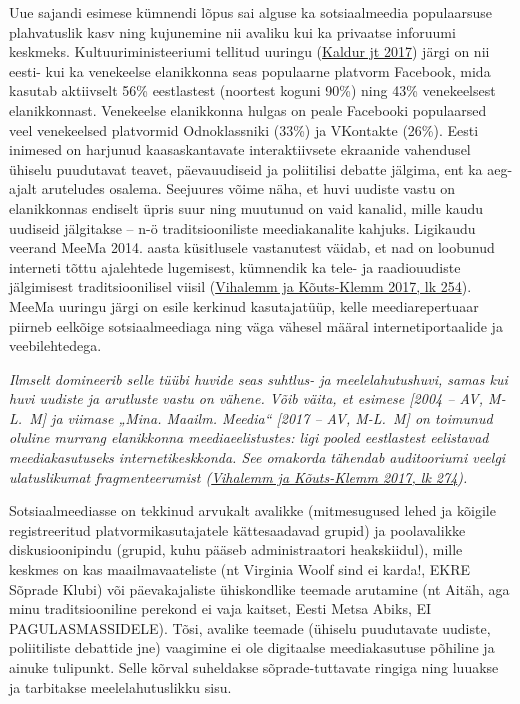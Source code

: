 \documentclass[estonian,]{article}
\begin{document}
Uue sajandi esimese kümnendi lõpus sai alguse ka sotsiaalmeedia populaarsuse plahvatuslik kasv ning kujunemine nii avaliku kui ka privaatse inforuumi keskmeks. Kultuuriministeeriumi tellitud uuringu (\protect\hyperlink{Kaldur2017}{Kaldur jt 2017}) järgi on nii eesti- kui ka venekeelse elanikkonna seas populaarne platvorm Facebook, mida kasutab aktiivselt 56\% eestlastest (noortest koguni 90\%) ning 43\% venekeelsest elanikkonnast. Venekeelse elanikkonna hulgas on peale Facebooki populaarsed veel venekeelsed platvormid Odnoklassniki (33\%) ja VKontakte (26\%). Eesti inimesed on harjunud kaasaskantavate interaktiivsete ekraanide vahendusel ühiselu puudutavat teavet, päevauudiseid ja poliitilisi debatte jälgima, ent ka aeg-ajalt aruteludes osalema. Seejuures võime näha, et huvi uudiste vastu on elanikkonnas endiselt üpris suur ning muutunud on vaid kanalid, mille kaudu uudiseid jälgitakse -- n-ö traditsiooniliste meediakanalite kahjuks. Ligikaudu veerand MeeMa 2014. aasta küsitlusele vastanutest väidab, et nad on loobunud interneti tõttu ajalehtede lugemisest, kümnendik ka tele- ja raadiouudiste jälgimisest traditsioonilisel viisil (\protect\hyperlink{Vihalemm2017}{Vihalemm ja Kõuts-Klemm 2017, lk 254}). MeeMa uuringu järgi on esile kerkinud kasutajatüüp, kelle meediarepertuaar piirneb eelkõige sotsiaalmeediaga ning väga vähesel määral internetiportaalide ja veebilehtedega.

\emph{Ilmselt domineerib selle tüübi huvide seas suhtlus- ja meelelahutushuvi, samas kui huvi uudiste ja arutluste vastu on vähene. Võib väita, et esimese {[}2004 -- AV, M-L.~M{]} ja viimase „Mina. Maailm. Meedia`` {[}2017 -- AV, M-L.~M{]} on toimunud oluline murrang elanikkonna meediaeelistustes: ligi pooled eestlastest eelistavad meediakasutuseks internetikeskkonda. See omakorda tähendab auditooriumi veelgi ulatuslikumat fragmenteerumist (\protect\hyperlink{Vihalemm2017}{Vihalemm ja Kõuts-Klemm 2017, lk 274}).}

Sotsiaalmeediasse on tekkinud arvukalt avalikke (mitmesugused lehed ja kõigile registreeritud platvormikasutajatele kättesaadavad grupid) ja poolavalikke diskusioonipindu (grupid, kuhu pääseb administraatori heakskiidul), mille keskmes on kas maailmavaateliste (nt Virginia Woolf sind ei karda!, EKRE Sõprade Klubi) või päevakajaliste ühiskondlike teemade arutamine (nt Aitäh, aga minu traditsiooniline perekond ei vaja kaitset, Eesti Metsa Abiks, EI PAGULASMASSIDELE). Tõsi, avalike teemade (ühiselu puudutavate uudiste, poliitiliste debattide jne) vaagimine ei ole digitaalse meediakasutuse põhiline ja ainuke tulipunkt. Selle kõrval suheldakse sõprade-tuttavate ringiga ning luuakse ja tarbitakse meelelahutuslikku sisu.
\end{document}

